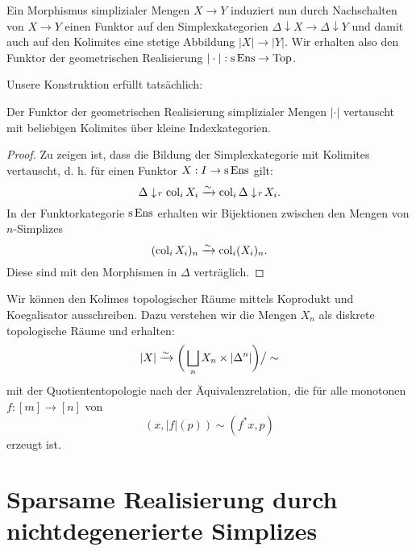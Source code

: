 Ein Morphismus simplizialer Mengen $X \to Y$ induziert nun durch
Nachschalten von $X \to Y$ einen Funktor auf den Simplexkategorien
$\Delta \downarrow X \to \Delta \downarrow Y$ und damit auch auf den
Kolimites eine stetige Abbildung $|X| \to |Y|$. Wir erhalten also den
Funktor der geometrischen Realisierung $| \cdot |: \operatorname{s} \operatorname{Ens} \to \operatorname{Top}$.

Unsere Konstruktion erfüllt tatsächlich:
\begin{prop} \label{real-cocont}
  Der Funktor der geometrischen Realisierung simplizialer Mengen $|
  \cdot|$ vertauscht mit beliebigen Kolimites über kleine
  Indexkategorien.
\end{prop}
\begin{proof}
  Zu zeigen ist, dass die Bildung der Simplexkategorie mit Kolimites
  vertauscht, d. h. für einen Funktor $X: I \to \operatorname{s}\operatorname{Ens}$ gilt:
  \[ \Delta \downarrow \! {\scriptstyle r} \, \operatorname{col}_i X_i \xrightarrow[]{\sim} \operatorname{col}_i \Delta \downarrow \! {\scriptstyle r} \, X_i. \]
  In der Funktorkategorie $\operatorname{s}\operatorname{Ens}$ erhalten wir Bijektionen zwischen
  den Mengen von $n$-Simplizes
  \[ (\operatorname{col}_i X_i)_n \xrightarrow[]{\sim} \operatorname{col}_i (X_i)_n. \]
  Diese sind mit den Morphismen in $\Delta$ verträglich.
\end{proof}

Wir können den Kolimes topologischer Räume mittels Koprodukt und
Koegalisator ausschreiben. Dazu verstehen wir die Mengen $X_n$ als
diskrete topologische Räume und erhalten:
\[ |X| \xrightarrow[]{\sim} \bigg( \bigsqcup_n X_n \times |\Delta^n| \bigg) \big/ \sim \]
mit der Quotiententopologie nach der Äquivalenzrelation, die für alle
monotonen $f: [m] \to [n]$ von 
\[ (x, |f|(p)) \sim (f^* x, p) \]
erzeugt ist.

\section{Sparsame Realisierung durch nichtdegenerierte Simplizes}

